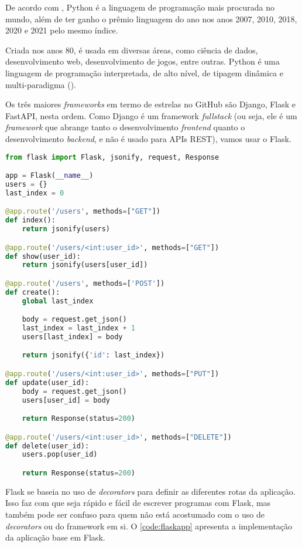 De acordo com \textcite{tiobeindex}, Python é a linguagem de programação mais procurada
no mundo, além de ter ganho o prêmio linguagem do ano nos anos 2007, 2010, 2018,
2020 e 2021 pelo mesmo índice.

Criada nos anos 80, é usada em diversas áreas, como ciência de
dados, desenvolvimento web, desenvolvimento de jogos, entre outras. Python é uma
linguagem de programação interpretada, de alto nível, de tipagem dinâmica e
multi-paradigma (\textcite{pythonmanual}).

Os três maiores \textit{frameworks} em termo de estrelas no GitHub são Django,
Flask e FastAPI, nesta ordem. Como Django é um framework \textit{fullstack} (ou seja,
ele é um \textit{framework} que abrange tanto o desenvolvimento \textit{frontend}
quanto o desenvolvimento \textit{backend}, e não é usado para APIs REST), vamos
usar o Flask.

\begin{lstlisting}[language=Python,label={code:flaskapp},caption={Aplicação base em Python com Flask}]
from flask import Flask, jsonify, request, Response

app = Flask(__name__)
users = {}
last_index = 0

@app.route('/users', methods=["GET"])
def index():
    return jsonify(users)

@app.route('/users/<int:user_id>', methods=["GET"])
def show(user_id):
    return jsonify(users[user_id])

@app.route('/users', methods=['POST'])
def create():
    global last_index

    body = request.get_json()
    last_index = last_index + 1
    users[last_index] = body

    return jsonify({'id': last_index})

@app.route('/users/<int:user_id>', methods=["PUT"])
def update(user_id):
    body = request.get_json()
    users[user_id] = body

    return Response(status=200)

@app.route('/users/<int:user_id>', methods=["DELETE"])
def delete(user_id):
    users.pop(user_id)

    return Response(status=200)

\end{lstlisting}

Flask se baseia no uso de \textit{decorators} para definir as diferentes rotas
da aplicação. Isso faz com que seja rápido e fácil de escrever programas com Flask,
mas também pode ser confuso para quem não está acostumado com o uso de \textit{decorators}
ou do framework em si. O \autoref{code:flaskapp} apresenta a implementação da aplicação
base em Flask.

